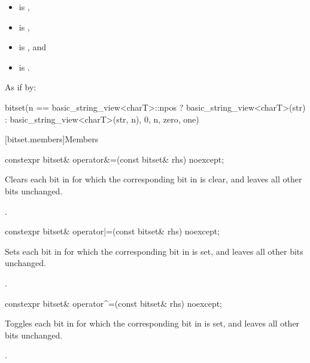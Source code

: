 \begin{itemdescr}
\pnum
\constraints
\begin{itemize}
\item {} is ,
\item {} is ,
\item {} is , and
\item {} is .
\end{itemize}

\pnum
\effects
As if by:
\begin{codeblock}
bitset(n == basic_string_view<charT>::npos
          ? basic_string_view<charT>(str)
          : basic_string_view<charT>(str, n),
       0, n, zero, one)
\end{codeblock}
\end{itemdescr}


[bitset.members]{Members}

%
\begin{itemdecl}
constexpr bitset& operator&=(const bitset& rhs) noexcept;
\end{itemdecl}

\begin{itemdescr}
\pnum
\effects
Clears each bit in
for which the corresponding bit in  is clear, and leaves all other bits unchanged.

\pnum
\returns
{}.
\end{itemdescr}

%
\begin{itemdecl}
constexpr bitset& operator|=(const bitset& rhs) noexcept;
\end{itemdecl}

\begin{itemdescr}
\pnum
\effects
Sets each bit in
for which the corresponding bit in  is set, and leaves all other bits unchanged.

\pnum
\returns
{}.
\end{itemdescr}

%
\begin{itemdecl}
constexpr bitset& operator^=(const bitset& rhs) noexcept;
\end{itemdecl}

\begin{itemdescr}
\pnum
\effects
Toggles each bit in
for which the corresponding bit in  is set, and leaves all other bits unchanged.

\pnum
\returns
{}.
\end{itemdescr}

